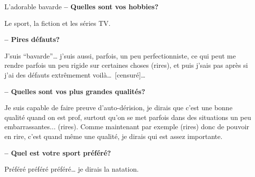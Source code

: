\documentclass{parch}
\begin{document}
{\begin{parchArticle}[2]{L’adorable bavarde}
			\textbf{-- Quelles sont vos hobbies?}
			
			Le sport, la fiction et les séries TV.
			
			\textbf{-- Pires défauts?}
			
			J’suis \enquote{bavarde}… j’suis aussi, parfois, un peu perfectionniste, ce qui peut me rendre parfois un peu rigide sur certaines choses (rires), et puis j’sais pas après si j’ai des défauts extrêmement voilà… [censuré]…
			
			\textbf{-- Quelles sont vos plus grandes qualités?}
			
			Je suis capable de faire preuve d’auto-dérision, je dirais que c’est une bonne qualité quand on est prof, surtout qu’on se met parfois dans des situations un peu embarrassantes... (rires). Comme maintenant par exemple (rires) donc de pouvoir en rire, c’est quand même une qualité,  je dirais qui est assez importante.
			
			\textbf{-- Quel est votre sport préféré?}
			
			Préféré préféré préféré… je dirais la natation.
			\endgroup
		\end{parchArticle}
	}
	
	\newpage
	
\end{document}
